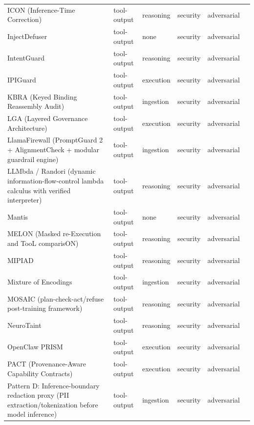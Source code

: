 \begin{longtable}{@{}p{}lllll@{}}
ICON (Inference-Time Correction) & tool-output & reasoning & security & adversarial & \cite{wang-2026-icon} \\
InjectDefuser & tool-output & none & security & adversarial & \cite{koide-2026-clouding} \\
IntentGuard & tool-output & reasoning & security & adversarial & \cite{kang-2025-mitigating} \\
IPIGuard & tool-output & execution & security & adversarial & \cite{an-2025-ipiguard} \\
KBRA (Keyed Binding Reassembly Audit) & tool-output & ingestion & security & adversarial & \cite{liu-2026-safe} \\
LGA (Layered Governance Architecture) & tool-output & execution & security & adversarial & \cite{ge-2026-governance} \\
LlamaFirewall (PromptGuard 2 + AlignmentCheck + modular guardrail engine) & tool-output & ingestion & security & adversarial & \cite{chennabasappa-2025-llamafirewall} \\
LLMbda / Randori (dynamic information-flow-control lambda calculus with verified interpreter) & tool-output & reasoning & security & adversarial & \cite{garby-2026-llmbda} \\
Mantis & tool-output & none & security & adversarial & \cite{pasquini-2024-hacking} \\
MELON (Masked re-Execution and TooL comparisON) & tool-output & reasoning & security & adversarial & \cite{zhu-2025-melon} \\
MIPIAD & tool-output & reasoning & security & adversarial & \cite{muhtadi-2026-mipiad} \\
Mixture of Encodings & tool-output & ingestion & security & adversarial & \cite{zhang-2025-defense} \\
MOSAIC (plan-check-act/refuse post-training framework) & tool-output & reasoning & security & adversarial & \cite{agarwal-2026-learning} \\
NeuroTaint & tool-output & reasoning & security & adversarial & \cite{cai-2026-ghost} \\
OpenClaw PRISM & tool-output & execution & security & adversarial & \cite{li-2026-openclaw} \\
PACT (Provenance-Aware Capability Contracts) & tool-output & execution & security & adversarial & \cite{fan-2026-granularity} \\
Pattern D: Inference-boundary redaction proxy (PII extraction/tokenization before model inference) & tool-output & ingestion & security & adversarial & \cite{mohan-2026-agent} \\

\end{longtable}
